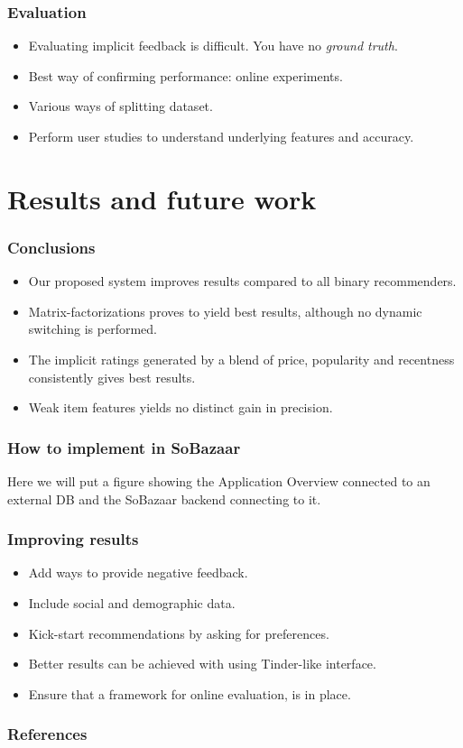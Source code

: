 \documentclass{beamer}
\begin{document}
  \begin{frame}
    \frametitle{Evaluation}
    \begin{itemize}
      \item Evaluating implicit feedback is difficult. You have no \textit{ground
      truth}.
      \item Best way of confirming performance: online experiments.
      \item Various ways of splitting dataset.
      \item Perform user studies to understand underlying features and
      accuracy.
    \end{itemize}
  \end{frame}

  \section{Results and future work}

  \begin{frame}
    \frametitle{Conclusions}
    \begin{itemize}
      \item Our proposed system improves results compared to all binary
      recommenders.
      \item Matrix-factorizations proves to yield best results, although no
      dynamic switching is performed.
      \item The implicit ratings generated by a blend of price, popularity and
      recentness consistently gives best results.
      \item Weak item features yields no distinct gain in precision.
    \end{itemize}
  \end{frame}

  \begin{frame}
    \frametitle{How to implement in SoBazaar}
    Here we will put a figure showing the Application Overview connected to an
    external DB and the SoBazaar backend connecting to it.
  \end{frame}

  \begin{frame}
    \frametitle{Improving results}
    \begin{itemize}
      \item Add ways to provide negative feedback.
      \item Include social and demographic data.
      \item Kick-start recommendations by asking for preferences.
      \item Better results can be achieved with using Tinder-like interface.
      \item Ensure that a framework for online evaluation, is in place.
    \end{itemize}
  \end{frame}

  \begin{frame}[allowframebreaks]
    \frametitle{References}
    
    
  \end{frame}
\end{document}
